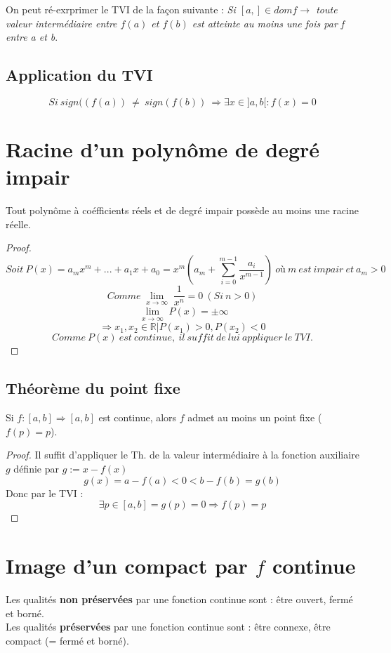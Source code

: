 \documentclass[11pt, a4paper, openany]{book}
\begin{document}
On peut ré-exrprimer le TVI de la façon suivante : \textit{Si $[a,] \in domf \rightarrow $ toute valeur intermédiaire entre $f(a)$ et $f(b)$ est atteinte au moins une fois par f entre a et b}.
\subsection*{Application du TVI}
$$Si\ sign((f(a))\ \neq\ sign(f(b))\ \Rightarrow \exists x \in ]a, b[ : f(x) = 0$$

\section*{Racine d'un polynôme de degré impair}
Tout polynôme à coéfficients réels et de degré impair possède au moins une racine réelle.

\begin{proof}
	$$Soit\ P(x) = a_{m}x^{m} + ... + a_{1}x + a_{0} = x^{m}(a_{m} + \sum_{i=0}^{m-1} \frac{a_{i}}{x^{m-1}})\ où\ m\ est\ impair\ et\ a_{m} > 0$$
	$$Comme \lim\limits_{\substack{x \to \infty}} \frac{1}{x^{n}} = 0\ (Si\ n > 0) $$
	$$ \lim\limits_{\substack{x \to \infty}} P(x) = \pm \infty$$
	$$ \Rightarrow x_{1}, x_{2} \in \mathbb{R} | P(x_{1}) > 0, P(x_{2}) < 0$$
	$$Comme\ P(x)\ est\ continue,\ il\ suffit\ de\ lui\ appliquer\ le\ TVI.$$
\end{proof}

\subsection{Théorème du point fixe}
Si $f: [a,b] \Longrightarrow [a,b]$ est continue, alors $f$ admet au moins un point fixe ($f(p) = p$).\\
\begin{proof}
	Il suffit d'appliquer le Th. de la valeur intermédiaire à la fonction auxiliaire $g$ définie par $g := x-f(x)$
	$$g(x) = a - f(a) < 0 < b - f(b) = g(b)$$
	Donc par le TVI : $$\exists p \in [a,b] = g(p) = 0 \Rightarrow f(p) = p$$
\end{proof}

\section{Image d'un compact par $f$ continue}
Les qualités \textbf{non préservées} par une fonction continue sont : être ouvert, fermé et borné.\\
Les qualités \textbf{préservées} par une fonction continue sont : être connexe, être compact (= fermé et borné).
\end{document}
